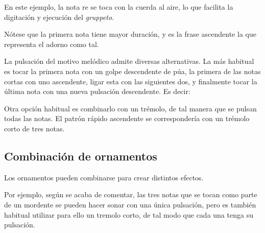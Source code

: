 \begin{center}
\end{center}



En este ejemplo, la nota re se toca con la cuerda al aire, lo que facilita la digitación y ejecución del \emph{gruppeto}.

Nótese que la primera nota tiene mayor duración, y es la frase ascendente la que representa el adorno como tal.

La pulsación del motivo melódico admite diversas alternativas. La más habitual es tocar la primera nota con un golpe descendente de púa, la primera de las notas cortas con uno ascendente, ligar esta con las siguientes dos, y finalmente tocar la última nota con una nueva pulsación descendente. Es decir:


\begin{center}
\end{center}



Otra opción habitual es combinarlo con un trémolo, de tal manera que se pulsan todas las notas. El patrón rápido ascendente se correspondería con un trémolo corto de tres notas.

\subsection{Combinación de ornamentos}

Los ornamentos pueden combinarse para crear distintos efectos.

Por ejemplo, según se acaba de comentar, las tres notas que se tocan como parte de un mordente se pueden hacer sonar con una única pulsación, pero es también habitual utilizar para ello un tremolo corto, de tal modo que cada una tenga su pulsación.

